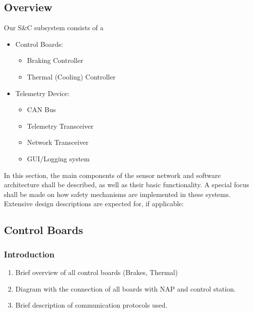 \subsection{Overview}

Our S\&C subsystem consists of a 
\begin{itemize}
    \item Control Boards: \begin{itemize}
            \item Braking Controller
            \item Thermal (Cooling) Controller
    \end{itemize}

    \item Telemetry Device: \begin{itemize}
            \item CAN Bus
            \item Telemetry Transceiver
            \item Network Transceiver
            \item GUI/Logging system
    \end{itemize}
\end{itemize}
In this section, the main components of the sensor network and software architecture shall be described, as well as their basic functionality. A special focus shall be made on how safety mechanisms are implemented in these systems. Extensive design descriptions are expected for, if applicable:

\subsection{Control Boards}
\subsubsection{Introduction}
\begin{enumerate}
    \item Brief overview of all control boards (Brakes, Thermal)
    \item Diagram with the connection of all boards with NAP and control station.
    \item Brief description of communication protocols used.
\end{enumerate}


